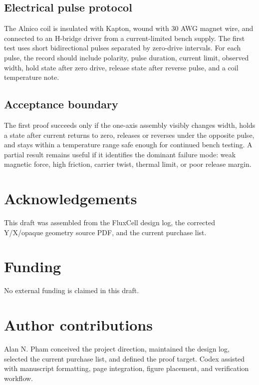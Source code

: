 \documentclass[12pt,letterpaper]{article}
\begin{document}
\subsection{Electrical pulse protocol}

The Alnico coil is insulated with Kapton, wound with 30 AWG magnet wire, and connected to an H-bridge driver from a current-limited bench supply. The first test uses short bidirectional pulses separated by zero-drive intervals. For each pulse, the record should include polarity, pulse duration, current limit, observed width, hold state after zero drive, release state after reverse pulse, and a coil temperature note.

\subsection{Acceptance boundary}

The first proof succeeds only if the one-axis assembly visibly changes width, holds a state after current returns to zero, releases or reverses under the opposite pulse, and stays within a temperature range safe enough for continued bench testing. A partial result remains useful if it identifies the dominant failure mode: weak magnetic force, high friction, carrier twist, thermal limit, or poor release margin.

\section{Acknowledgements}

This draft was assembled from the FluxCell design log, the corrected Y/X/opaque geometry source PDF, and the current purchase list.

\section{Funding}

No external funding is claimed in this draft.

\section{Author contributions}

Alan N. Pham conceived the project direction, maintained the design log, selected the current purchase list, and defined the proof target. Codex assisted with manuscript formatting, page integration, figure placement, and verification workflow.
\end{document}
